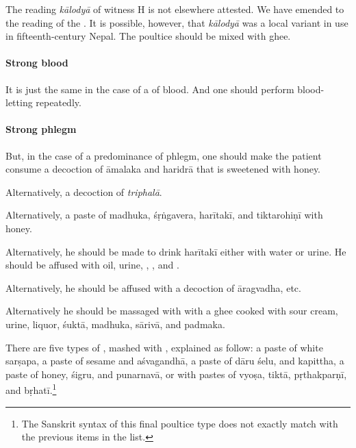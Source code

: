 \begin{translation}
{The reading \emph{kālodyā} of witness H is not elsewhere attested. We
have emended to the reading of the \citep[425]{vulgate}. It is
possible, however, that \emph{kālodyā} was a local variant in use in
fifteenth-century Nepal.} The poultice should be mixed with ghee.


\paragraph{Strong blood}    

\item[9]

It is just the same in the case of a  of blood. And
one should perform blood-letting repeatedly.


\paragraph{Strong phlegm}  

\item[10]

But, in the case of a predominance of
phlegm, one should make the patient 
consume a decoction of
\gls{āmalaka} and \gls{haridrā} that is sweetened with honey.  

Alternatively, a decoction of \textit{triphalā}.

Alternatively, a paste of \gls{madhuka}, \gls{śṛṅgavera},
\gls{harītakī}, and \gls{tiktarohiṇī} with honey. 

Alternatively, he should be made to drink
\gls{harītakī} either with water or urine.   He should be
affused with oil, urine, ,  , and . 
   
Alternatively, he should be affused  with a decoction of \gls{āragvadha}, etc.

Alternatively he should be massaged with 
with a ghee cooked with
sour cream, urine, liquor, \gls{śuktā}, \gls{madhuka},
    \gls{sārivā}, and \gls{padmaka}.
    
\label{pradeha}
There are five types of , mashed with
, explained as follow: %
a paste of white \gls{sarṣapa}, %
a paste of sesame and \gls{aśvagandhā}, %
a paste of \gls{dāru} \gls{śelu}, and \gls{kapittha}, %
a paste of honey, \gls{śigru}, and \gls{punarnavā}, %
or with pastes of \gls{vyoṣa}, \gls{tiktā}, \gls{pṛthakparṇī}, and
\gls{bṛhatī}.\footnote{The Sanskrit syntax of this final poultice type does not
    exactly match with the previous items in the list.}
    

\end{translation}
